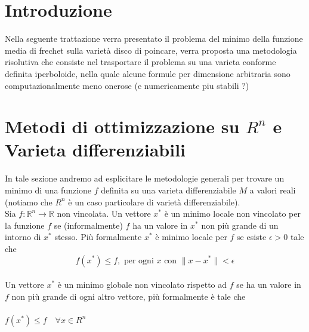 \documentclass[a4paper, 12pt]{article}
\begin{document}
\renewcommand{\contentsname}{Contenuti}
\tableofcontents

\newpage

\section{Introduzione}
Nella seguente trattazione verra presentato il problema del minimo della funzione media di frechet sulla varietà disco di poincare, verra proposta una metodologia risolutiva che consiste nel trasportare il problema su una varieta conforme definita iperboloide, nella quale alcune formule per dimensione arbitraria sono computazionalmente meno onerose (e numericamente piu stabili ?)

\section{Metodi di ottimizzazione su $R^n$ e Varieta differenziabili}
In tale sezione andremo ad esplicitare le metodologie generali per trovare un minimo di una funzione $f$ definita su una varieta differenziabile $M$ a valori reali (notiamo che $R^n$ è un caso particolare di varietà differenziabile).\\
Sia $f: \mathbb{R} ^n \to \mathbb{R}$ non vincolata.
Un vettore $x^\ast$ è un minimo locale non vincolato per la funzione $f$ se (informalmente) $f$ ha un valore in $x^\ast$ non più grande di un intorno di $x^\ast$ stesso. Più formalmente $x^\ast$ è minimo locale per $f$ se esiste $\epsilon > 0$ tale che\\
\[f(x^\ast) \leq f, \mbox{ per ogni } x \mbox{ con } \parallel x - x^\ast \parallel < \epsilon\]\\
Un vettore $x^\ast$ è un minimo globale non vincolato rispetto ad $f$ se ha un valore in $f$ non più grande di ogni altro vettore, più formalmente è tale che\\\\
$f(x^\ast) \leq f \quad \forall x \in R^n$\\\\
\end{document}
